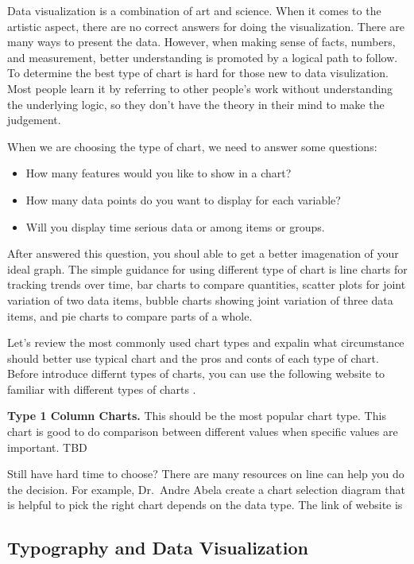 \documentclass[]{book}
\providecommand{\tightlist}{%
  \setlength{\itemsep}{0pt}\setlength{\parskip}{0pt}}
\theoremstyle{definition}
\theoremstyle{definition}
\theoremstyle{definition}
\theoremstyle{remark}
\begin{document}
Data visualization is a combination of art and science. When it comes to
the artistic aspect, there are no correct answers for doing the
visualization. There are many ways to present the data. However, when
making sense of facts, numbers, and measurement, better understanding is
promoted by a logical path to follow. To determine the best type of
chart is hard for those new to data visulization. Most people learn it
by referring to other people's work without understanding the underlying
logic, so they don't have the theory in their mind to make the
judgement.

When we are choosing the type of chart, we need to answer some
questions:

\begin{itemize}
\tightlist
\item
  How many features would you like to show in a chart?
\item
  How many data points do you want to display for each variable?
\item
  Will you display time serious data or among items or groups.
\end{itemize}

After answered this question, you shoul able to get a better imagenation
of your ideal graph. The simple guidance for using different type of
chart is line charts for tracking trends over time, bar charts to
compare quantities, scatter plots for joint variation of two data items,
bubble charts showing joint variation of three data items, and pie
charts to compare parts of a whole.

Let's review the most commonly used chart types and expalin what
circumstance should better use typical chart and the pros and conts of
each type of chart. Before introduce differnt types of charts, you can
use the following website to familiar with different types of charts
\citep{charts_viz}.

\textbf{Type 1 Column Charts.} This should be the most popular chart
type. This chart is good to do comparison between different values when
specific values are important. TBD

Still have hard time to choose? There are many resources on line can
help you do the decision. For example, Dr.~Andre Abela create a chart
selection diagram that is helpful to pick the right chart depends on the
data type. The link of website is

\subsection{Typography and Data
Visualization}\label{typography-and-data-visualization}
\end{document}
